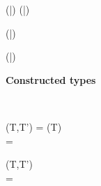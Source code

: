 \begin{figure*}[htbp]
\begin{minipage}[t]{.4\textwidth}
\infrule
  { \countof(\bar{\alpha}) \neq \countof(\bar{\eta}) }
  { \jexc{(\bar{\alpha})}{(\bar{\eta})}{\TRUE} }

\infrule
  { \countof(\bar{\eta})  }
  {  }

\infrule
  { \countof(\bar{\eta})  }
  { \jexc{\arrowtype{\alpha}{\rho}}{(\bar{\eta})}{\TRUE} }

\infax
  {  }

\infax
  {  }

\end{minipage}%
\begin{minipage}[t]{.6\textwidth}
\centering
\textbf{Constructed types}
\vspace*{-1em}

\infrule
  {  \andalso
     \\
     \andalso
     }
  {  }

\infrule
  {  \andalso {} }
  {  }

\infrule
  {  \andalso {} }
  {  }

\infrule
  {  \andalso {} }
  {  }

\infax
  {  }

\infax
  {  }

\infax
  {  }

\infrule
  { (T,T')  \andalso  \setb{\chi} = \ancestors(T\obb{\alpha}) \\[1pt]
    \setb{\omega} = \bigcup\setb{\myexcludes{\chi}}  \andalso  {} }
  {  }

\infrule
  { (T,T')  \\
    \setb{\omega} = \bigcup{}  \andalso  {}
}
  {  }


\end{minipage}
\end{figure*}
